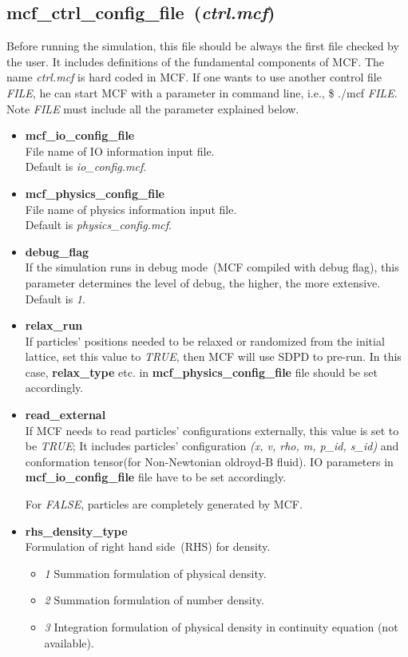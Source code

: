 \documentclass[a4paper,10pt]{article}
\begin{document}
\subsection{\textbf{mcf\_ctrl\_config\_file}~(\textit{ctrl.mcf})}
Before running the  simulation,
this file should be always the first file
checked by the user.
It includes definitions of the fundamental components of MCF.
The name \textit{ctrl.mcf} is hard coded in MCF.
If one wants to use another control file \textit{FILE},
he can start MCF with a parameter in command line, 
i.e., \$ ./mcf \textit{FILE}.
Note \textit{FILE} must include all 
the parameter explained below.
\begin{itemize}
\item
\textbf{mcf\_io\_config\_file}\\
File name of IO information input file.\\
Default is \textit{io\_config.mcf}.

\item
\textbf{mcf\_physics\_config\_file}\\
File name of physics information input file.\\
Default is \textit{physics\_config.mcf}.

\item
\textbf{debug\_flag}\\
If the simulation runs in debug mode~(MCF compiled with debug flag),
this parameter determines the level of debug,
the higher, the more extensive.
Default is \textit{1}.

\item
\textbf{relax\_run}\\
If particles' positions needed to be 
relaxed or randomized from the initial lattice,
set this value to \textit{TRUE},
then MCF will use SDPD to pre-run.
In this case, \textbf{relax\_type} etc. in
\textbf{mcf\_physics\_config\_file} file 
should be set accordingly.

\item
\textbf{read\_external}\\
If MCF needs to read particles' configurations externally,
this value is set to be \textit{TRUE};
It includes particles' configuration
\textit{(x, v, rho, m, p\_id, s\_id)} and
conformation tensor(for Non-Newtonian oldroyd-B fluid).
IO parameters in \textbf{mcf\_io\_config\_file} file have to be set accordingly.

For \textit{FALSE}, particles are completely generated by MCF.

\item
\textbf{rhs\_density\_type} \\
Formulation of right hand side~(RHS) for density.
\begin{itemize}
 \item \textit{1} Summation formulation of physical density\cite{Monaghan1992}.
 \item \textit{2} Summation formulation of number density\cite{Espanol2003}.
 \item \textit{3} Integration formulation of physical density\cite{Monaghan1992}\cite{Morris1997} 
       in continuity equation (not available).
\end{itemize}


\end{itemize}
\end{document}

